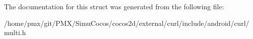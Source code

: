 The documentation for this struct was generated from the following file\+:\begin{DoxyCompactItemize}
\item 
/home/pmx/git/\+P\+M\+X/\+Simu\+Cocos/cocos2d/external/curl/include/android/curl/multi.\+h\end{DoxyCompactItemize}
